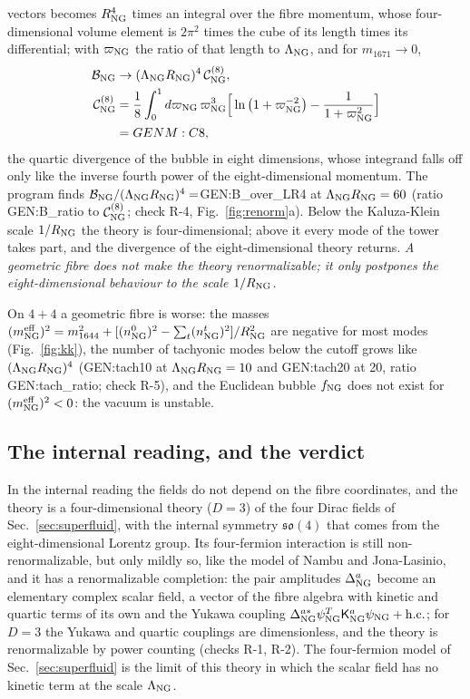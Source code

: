 vectors becomes $R^4_{\rm NG}$ times an integral over the fibre momentum, whose four-dimensional volume
element is $2\pi^2$ times the cube of its length times its differential; with
$\varpi_{\rm NG}$ the ratio of that length to $\Lambda_{\rm NG}$, and for $m_{1671}\to0$,
\begin{align}
\mathcal B_{\rm NG}&\to(\Lambda_{\rm NG}R_{\rm NG})^4\,\mathcal C^{(8)}_{\rm NG},\nonumber\\
\mathcal C^{(8)}_{\rm NG}&=\frac18\int_0^1d\varpi_{\rm NG}\,\varpi_{\rm NG}^3\Big[\ln\big(1+\varpi_{\rm NG}^{-2}\big)
-\frac1{1+\varpi_{\rm NG}^2}\Big]\nonumber\\
&={{GENM:C8}},
\label{eq:c8}
\end{align}
the quartic divergence of the bubble in eight dimensions, whose integrand falls off only like the
inverse fourth power of the eight-dimensional momentum. The program finds
$\mathcal B_{\rm NG}/(\Lambda_{\rm NG}R_{\rm NG})^4=${{GEN:B_over_LR4}} at $\Lambda_{\rm NG}R_{\rm NG}=60$ (ratio
{{GEN:B_ratio}} to $\mathcal C^{(8)}_{\rm NG}$; check R-4, Fig.~\ref{fig:renorm}a). Below the
Kaluza-Klein scale $1/R_{\rm NG}$ the theory is four-dimensional; above it every mode of the tower takes
part, and the divergence of the eight-dimensional theory returns. \emph{A geometric fibre does not make
the theory renormalizable; it only postpones the eight-dimensional behaviour to the scale
$1/R_{\rm NG}$.}

On $4+4$ a geometric fibre is worse: the masses $(m^{\rm eff}_{\rm NG})^2=m_{1644}^2+[(n^0_{\rm NG})^2-
\sum_t(n^t_{\rm NG})^2]/R^2_{\rm NG}$ are negative for most modes (Fig.~\ref{fig:kk}), the number of tachyonic
modes below the cutoff grows like $(\Lambda_{\rm NG}R_{\rm NG})^4$ ({{GEN:tach10}} at
$\Lambda_{\rm NG}R_{\rm NG}=10$ and {{GEN:tach20}} at 20, ratio {{GEN:tach_ratio}}; check R-5), and the
Euclidean bubble $f_{\rm NG}$ does not exist for $(m^{\rm eff}_{\rm NG})^2<0$: the vacuum is unstable.

\subsection{The internal reading, and the verdict}

In the internal reading the fields do not depend on the fibre coordinates, and the theory is a
four-dimensional theory ($D=3$) of the four Dirac fields of Sec.~\ref{sec:superfluid}, with the
internal symmetry $\mathfrak{so}(4)$ that comes from the eight-dimensional Lorentz group. Its four-fermion
interaction is still non-renormalizable, but only mildly so, like the model of Nambu and
Jona-Lasinio, and it has a renormalizable completion: the pair amplitudes $\Delta^a_{\rm NG}$ become an
elementary complex scalar field, a vector of the fibre algebra with kinetic and quartic terms of its own
and the Yukawa coupling $\Delta^{a*}_{\rm NG}\psi^T_{\rm NG}\mathsf K^a_{\rm NG}\psi_{\rm NG}+{\rm h.c.}$; for $D=3$
the Yukawa and quartic couplings are dimensionless, and the theory is renormalizable by power counting
(checks R-1, R-2). The four-fermion model of Sec.~\ref{sec:superfluid} is the limit of this theory in which
the scalar field has no kinetic term at the scale $\Lambda_{\rm NG}$.

